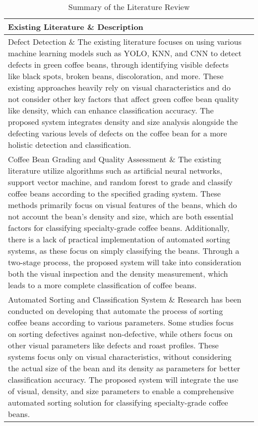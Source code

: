 \begin{center}
    \begin{longtable}{| p{4cm} | p{10cm} |}
    \hline
	\caption{Summary of the Literature Review} 	
    Existing Literature \& Description \\ \hline
    Defect Detection \& The existing literature focuses on using various machine learning models such as YOLO, KNN, and CNN to detect defects in green coffee beans, 
	through identifying visible defects like black spots, broken beans, discoloration, and more. These existing approaches heavily rely on visual characteristics 
	and do not consider other key factors that affect green coffee bean quality like density, which can enhance classification accuracy. The proposed system 
	integrates density and size analysis alongside the defecting various levels of defects on the coffee bean for a more holistic detection and classification. \\ \hline
    Coffee Bean Grading and Quality Assessment \& The existing literature utilize algorithms such as artificial neural networks, support vector machine, and random 
	forest to grade and classify coffee beans according to the specified grading system. These methods primarily focus on visual features of the beans, 
	which do not account the bean’s density and size, which are both essential factors for classifying specialty-grade coffee beans. Additionally, there is a lack of 
	practical implementation of automated sorting systems, as these focus on simply classifying the beans. Through a two-stage process, the proposed system will 
	take into consideration both the visual inspection and the density measurement, which leads to a more complete classification of coffee beans. \\ \hline
    Automated Sorting and Classification System \& Research has been conducted on developing that automate the process of sorting coffee beans according to various parameters. 
	Some studies focus on sorting defectives against non-defective, while others focus on other visual parameters like defects and roast profiles. These systems focus only on visual 
	characteristics, without considering the actual size of the bean and its density as parameters for better classification accuracy. The proposed system will integrate the use of visual, density, and size parameters to enable a comprehensive automated sorting solution for classifying specialty-grade coffee beans. \\
    \hline
    \end{longtable}
\end{center}

